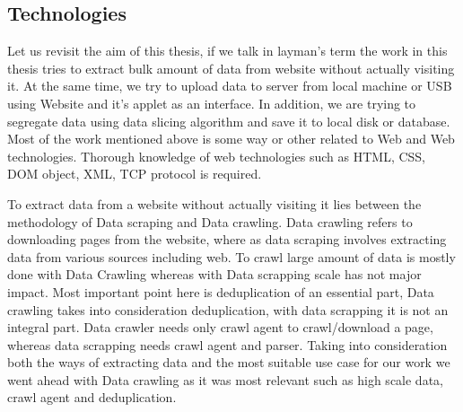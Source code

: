 \documentclass[article,type=msc,colorback,accentcolor=tud9c,twoside,11pt]{tudthesis}
\begin{document}
\subsection{Technologies}
Let us revisit the aim of this thesis, if we talk in layman's term the work in this thesis tries to extract bulk amount of data from website without actually visiting it. At the same time, we try to upload data to server from local machine or USB using Website and it's applet as an interface. In addition, we are trying to segregate data using data slicing algorithm and save it to local disk or database. Most of the work mentioned above is some way or other related to Web and Web technologies. Thorough knowledge of web technologies such as HTML, CSS, DOM object, XML, TCP protocol is required.

To extract data from a website without actually visiting it lies between the methodology of Data scraping and Data crawling. Data crawling refers to downloading pages from the website, where as data scraping involves extracting data from various sources including web. To crawl  large amount of data is mostly done with Data Crawling whereas with Data scrapping scale has not major impact. Most important point here is deduplication of an essential part, Data crawling takes into consideration deduplication, with data scrapping it is not an integral part. Data crawler needs only crawl agent to crawl/download a page, whereas data scrapping needs crawl agent and parser. Taking into consideration both the ways of extracting data and the most suitable use case for our work we went ahead with Data crawling as it was most relevant such as high scale data, crawl agent and deduplication.
\end{document}

